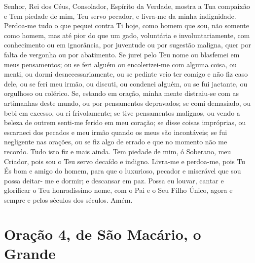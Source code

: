 \documentclass{subfiles}
\begin{document}
Senhor, Rei dos Céus, Consolador, Espírito da Verdade, mostra a Tua 
compaixão e Tem piedade de mim, Teu servo pecador, e livra-me da minha 
indignidade. Perdoa-me tudo o que pequei contra Ti hoje, como homem que 
sou, não somente como homem, mas até pior do que um gado, voluntária e 
involuntariamente, com conhecimento ou em ignorância, por juventude ou 
por sugestão maligna, quer por falta de vergonha ou por abatimento. Se jurei 
pelo Teu nome ou blasfemei em meus pensamentos; ou se feri alguém ou 
encolerizei-me com alguma coisa, ou menti, ou dormi desnecessariamente, ou 
se pedinte veio ter comigo e não fiz caso dele, ou se feri meu irmão, ou discuti, 
ou condenei alguém, ou se fui jactante, ou orgulhoso ou colérico. Se, estando 
em oração, minha mente distraiu-se com as artimanhas deste mundo, ou por 
pensamentos depravados; se comi demasiado, ou bebi em excesso, ou ri 
frivolamente; se tive pensamentos malignos, ou vendo a beleza de outrem 
senti-me ferido em meu coração; se disse coisas impróprias, ou escarneci dos 
pecados e meu irmão quando os meus são incontáveis; se fui negligente nas 
orações, ou se fiz algo de errado e que no momento não me recordo. Tudo isto 
fiz e mais ainda. Tem piedade de mim, ó Soberano, meu Criador, pois sou o 
Teu servo decaído e indigno. Livra-me e perdoa-me, pois Tu És bom e amigo 
do homem, para que o luxurioso, pecador e miserável que sou possa deitar-
me e dormir; e descansar em paz. Possa eu louvar, cantar e glorificar o Teu 
honradíssimo nome, com o Pai e o Seu Filho Único, agora e sempre e pelos 
séculos dos séculos. Amém.


\section*{Oração 4, de São Macário, o Grande}
 
\end{document}
